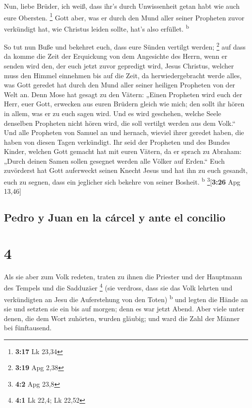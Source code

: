  Nun, liebe Brüder, ich weiß, dass ihr's durch
Unwissenheit getan habt wie auch eure Obersten. \footnote{\textbf{3:17}
  Lk 23,34}  Gott aber, was er durch den Mund aller
seiner Propheten zuvor verkündigt hat, wie Christus leiden sollte, hat's
also erfüllet. \textsuperscript{b}

 So tut nun Buße und bekehret euch, dass eure Sünden
vertilgt werden; \footnote{\textbf{3:19} Apg 2,38}  auf
dass da komme die Zeit der Erquickung von dem Angesichte des Herrn, wenn
er senden wird den, der euch jetzt zuvor gepredigt wird, Jesus Christus,
 welcher muss den Himmel einnehmen bis auf die Zeit, da
herwiedergebracht werde alles, was Gott geredet hat durch den Mund aller
seiner heiligen Propheten von der Welt an.  Denn Mose hat
gesagt zu den Vätern: „Einen Propheten wird euch der Herr, euer Gott,
erwecken aus euren Brüdern gleich wie mich; den sollt ihr hören in
allem, was er zu euch sagen wird.  Und es wird geschehen,
welche Seele denselben Propheten nicht hören wird, die soll vertilgt
werden aus dem Volk.``  Und alle Propheten von Samuel an
und hernach, wieviel ihrer geredet haben, die haben von diesen Tagen
verkündigt.  Ihr seid der Propheten und des Bundes
Kinder, welchen Gott gemacht hat mit euren Vätern, da er sprach zu
Abraham: „Durch deinen Samen sollen gesegnet werden alle Völker auf
Erden.``  Euch zuvörderst hat Gott auferweckt seinen
Knecht Jesus und hat ihn zu euch gesandt, euch zu segnen, dass ein
jeglicher sich bekehre von seiner Bosheit. \textsuperscript{b}
\footnote{\textbf{4:2} Apg 23,8}{[}\textbf{3:26} Apg 13,46{]}

\hypertarget{pedro-y-juan-en-la-cuxe1rcel-y-ante-el-concilio}{%
\subsection{Pedro y Juan en la cárcel y ante el
concilio}\label{pedro-y-juan-en-la-cuxe1rcel-y-ante-el-concilio}}

\hypertarget{section-3}{%
\section{4}\label{section-3}}

 Als sie aber zum Volk redeten, traten zu ihnen die
Priester und der Hauptmann des Tempels und die Sadduzäer \footnote{\textbf{4:1}
  Lk 22,4; Lk 22,52}  (sie verdross, dass sie das Volk
lehrten und verkündigten an Jesu die Auferstehung von den Toten)
\textsuperscript{b}  und legten die Hände an sie und
setzten sie ein bis auf morgen; denn es war jetzt Abend. 
Aber viele unter denen, die dem Wort zuhörten, wurden gläubig; und ward
die Zahl der Männer bei fünftausend.

